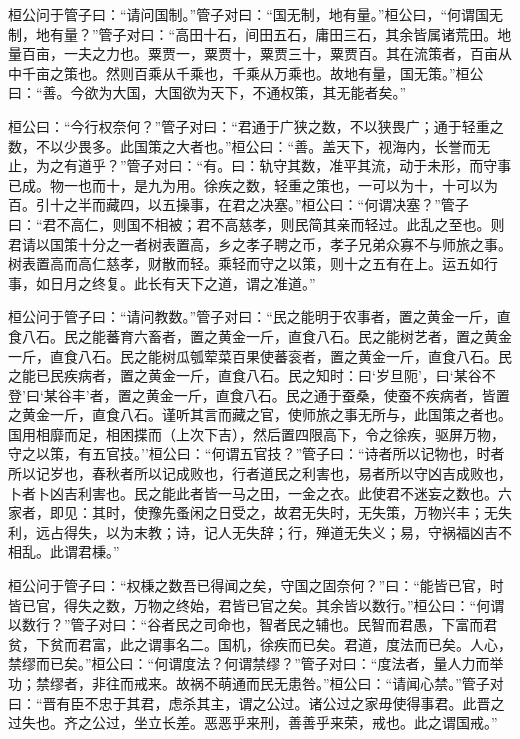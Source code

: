 \documentclass[]{article}
\begin{document}
桓公问于管子曰：``请问国制。''管子对曰：``国无制，地有量。''桓公曰，``何谓国无制，地有量？''管子对曰：``高田十石，间田五石，庸田三石，其余皆属诸荒田。地量百亩，一夫之力也。粟贾一，粟贾十，粟贾三十，粟贾百。其在流策者，百亩从中千亩之策也。然则百乘从千乘也，千乘从万乘也。故地有量，国无策。''桓公曰：``善。今欲为大国，大国欲为天下，不通权策，其无能者矣。''

桓公曰：``今行权奈何？''管子对曰：``君通于广狭之数，不以狭畏广；通于轻重之数，不以少畏多。此国策之大者也。''桓公曰：``善。盖天下，视海内，长誉而无止，为之有道乎？''管子对曰：``有。曰：轨守其数，准平其流，动于未形，而守事已成。物一也而十，是九为用。徐疾之数，轻重之策也，一可以为十，十可以为百。引十之半而藏四，以五操事，在君之决塞。''桓公曰：``何谓决塞？''管子曰：``君不高仁，则国不相被；君不高慈孝，则民简其亲而轻过。此乱之至也。则君请以国策十分之一者树表置高，乡之孝子聘之币，孝子兄弟众寡不与师旅之事。树表置高而高仁慈孝，财散而轻。乘轻而守之以策，则十之五有在上。运五如行事，如日月之终复。此长有天下之道，谓之准道。''

桓公问于管子曰：``请问教数。''管子对曰：``民之能明于农事者，置之黄金一斤，直食八石。民之能蕃育六畜者，置之黄金一斤，直食八石。民之能树艺者，置之黄金一斤，直食八石。民之能树瓜瓠荤菜百果使蕃衮者，置之黄金一斤，直食八石。民之能已民疾病者，置之黄金一斤，直食八石。民之知时：曰`岁旦阨'，曰`某谷不登'曰`某谷丰'者，置之黄金一斤，直食八石。民之通于蚕桑，使蚕不疾病者，皆置之黄金一斤，直食八石。谨听其言而藏之官，使师旅之事无所与，此国策之者也。国用相靡而足，相困揲而（上次下吉），然后置四限高下，令之徐疾，驱屏万物，守之以策，有五官技。''桓公曰：``何谓五官技？''管子曰：``诗者所以记物也，时者所以记岁也，春秋者所以记成败也，行者道民之利害也，易者所以守凶吉成败也，卜者卜凶吉利害也。民之能此者皆一马之田，一金之衣。此使君不迷妄之数也。六家者，即见：其时，使豫先蚤闲之日受之，故君无失时，无失策，万物兴丰；无失利，远占得失，以为末教；诗，记人无失辞；行，殚道无失义；易，守祸福凶吉不相乱。此谓君棅。''

桓公问于管子曰：``权棅之数吾已得闻之矣，守国之固奈何？''曰：``能皆已官，时皆已官，得失之数，万物之终始，君皆已官之矣。其余皆以数行。''桓公曰：``何谓以数行？''管子对曰：``谷者民之司命也，智者民之辅也。民智而君愚，下富而君贫，下贫而君富，此之谓事名二。国机，徐疾而已矣。君道，度法而已矣。人心，禁缪而已矣。''桓公曰：``何谓度法？何谓禁缪？''管子对曰：``度法者，量人力而举功；禁缪者，非往而戒来。故祸不萌通而民无患咎。''桓公曰：``请闻心禁。''管子对曰：``晋有臣不忠于其君，虑杀其主，谓之公过。诸公过之家毋使得事君。此晋之过失也。齐之公过，坐立长差。恶恶乎来刑，善善乎来荣，戒也。此之谓国戒。''
\end{document}

